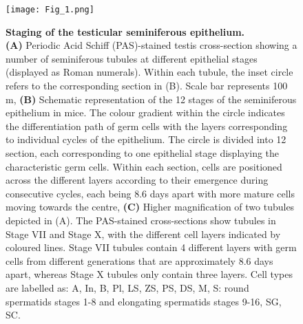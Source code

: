 \newpage

\begin{figure}[!h]
\centering
\texttt{[image: Fig\_1.png]}
\caption[Staging of the testicular seminiferous epithelium]{\textbf{Staging of the testicular seminiferous epithelium.}\\
\textbf{(A)} Periodic Acid Schiff (PAS)-stained testis cross-section showing a number of seminiferous tubules at different epithelial stages (displayed as Roman numerals). Within each tubule, the inset circle refers to the corresponding section in (B). Scale bar represents 100 \textmu{}m, \textbf{(B)} Schematic representation of the 12 stages of the seminiferous epithelium in mice. The colour gradient within the circle indicates the differentiation path of germ cells with the layers corresponding to individual cycles of the epithelium. The circle is divided into 12 section, each corresponding to one epithelial stage displaying the characteristic germ cells. Within each section, cells are positioned across the different layers according to their emergence during consecutive cycles, each being 8.6 days apart with more mature cells moving towards the centre, \textbf{(C)} Higher magnification of two tubules depicted in (A). The PAS-stained cross-sections show tubules in Stage VII and Stage X, with the different cell layers indicated by coloured lines. Stage VII tubules contain 4 different layers with germ cells from different generations that are approximately 8.6 days apart, whereas Stage X tubules only contain three layers. Cell types are labelled as: \gls{A}, \gls{In}, \gls{B}, \gls{Pl}, \gls{LS}, \gls{ZS}, \gls{PS}, \gls{DS}, \gls{M}, \gls{S}: round spermatids stages 1-8 and elongating spermatids stages 9-16, \gls{SG}, \gls{SC}.}
\label{fig3:cell_staging}
\end{figure}

\newpage

